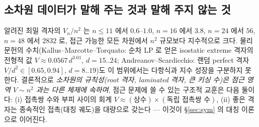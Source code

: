 \subsection{소차원 데이터가 말해 주는 것과 말해 주지 않는 것}
알려진 최밀 격자의 $V_n/n^2$ 는 $n\le11$ 에서 $0.6$--$1.0$, $n=16$ 에서 $3.8$, $n=24$ 에서 $56$, $n=48$ 에서 $2832$ 로, 접근 가능한 모든 차원에서 $n^2$ 규모보다 지수적으로 크다. 물리 문헌의 수치(Kallus--Marcotte--Torquato: 순차 LP 로 얻은 isostatic extreme 격자의 전형적 값 $V\approx0.0567\,d^{3.01}$, $d=15..24$; Andreanov--Scardicchio: 랜덤 perfect 격자 $V/d^2\in[0.65,0.94]$, $d=8..19$)도 이 범위에서는 다항식과 지수 성장을 구분하지 못한다. 결론적으로 \emph{소차원의 규칙성(root 격자, laminated 격자, 큰 키싱 수)은 점근 영역 $V\sim n^2$ 과는 다른 체제에 속하며}, 점근 문제에 쓸 수 있는 구조적 교훈은 다음 둘이다: (i) 접촉쌍 수와 부피 사이의 회계 $V\approx(\text{상수})\times(\text{독립 접촉쌍 수})$, (ii) 좋은 격자는 종속적인 접촉(대칭 궤도)을 대량으로 갖는다 --- 이것이 \S\ref{sec:sym} 의 대칭 이론으로 이어진다.
